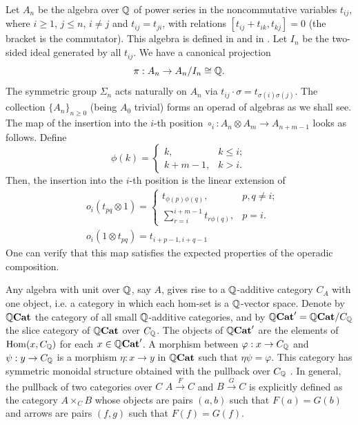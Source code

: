 \documentclass[TFM.tex]{subfiles}
\begin{document}
Let $A_n$ be the algebra over $\mathbb{Q}$ of power series in the noncommutative variables $t_{ij}$, where $i\geq 1$, $j\leq n$, $i\neq j$ and $t_{ij}=t_{ji}$, with relations $[t_{ij}+t_{ik},t_{kj}]=0$ (the bracket is the commutator). This algebra is defined in \cite{Tamarkin} and in \cite{1deTamarkin}. Let $I_n$ be the two-sided ideal generated by all $t_{ij}$. We have a canonical projection 
\begin{equation}\label{canonical}
\pi:A_n\to A_n/I_n\cong\mathbb{Q}.
\end{equation}
The symmetric group $\Sigma_n$ acts naturally on $A_n$ via  $t_{ij}\cdot\sigma=t_{\sigma(i)\sigma(j)}$. The collection $\{A_n\}_{n\geq 0}$ (being $A_0$ trivial) forms an operad of algebras as we shall see. The map of the insertion into the $i$-th position $\circ_i: A_n\otimes A_m\to A_{n+m-1}$ looks as follows. Define
\[
\phi(k)=\begin{cases}
k, & k\leq i;\\
k+m-1, & k>i.
\end{cases}
\]
Then, the insertion into the $i$-th position is the linear extension of
\begin{align*}
&o_i(t_{pq}\otimes 1)=\begin{cases}
t_{\phi(p)\phi(q)}, &p,q\neq i;\\
\sum_{r=i}^{i+m-1}t_{r\phi(q)}, & p=i.
\end{cases} \\
& o_i(1\otimes t_{pq})=t_{i+p-1,i+q-1}
\end{align*}
One can verify that this map satisfies the expected properties of the operadic composition. %

Any algebra with unit over $\mathbb{Q}$, say $A$, gives rise to a $\mathbb{Q}$-additive category $C_A$ with one object, i.e. a category in which each hom-set is a $\mathbb{Q}$-vector space. Denote by $\mathbb{Q}\mathrm{\mathbf{Cat}}$ the category of all small $\mathbb{Q}$-additive categories, and by $\mathbb{Q}\mathrm{\mathbf{Cat}}'=\mathbb{Q}\mathrm{\mathbf{Cat}}/C_{\mathbb{Q}}$ the slice category of $\mathbb{Q}\mathrm{\mathbf{Cat}}$ over $C_{\mathbb{Q}}$. The objects of $\mathbb{Q}\mathrm{\mathbf{Cat}}'$ are the elements of $\operatorname{Hom}(x, C_{\mathbb{Q}})$ for each $x\in \mathbb{Q}\mathrm{\mathbf{Cat}}'$. A morphism between $\varphi:x\to C_{\mathbb{Q}}$ and $\psi:y\to C_{\mathbb{Q}}$ is a morphism $\eta: x\to y$ in $\mathbb{Q}\mathrm{\mathbf{Cat}}$ such that $\eta\psi=\varphi$.  This category has symmetric monoidal structure obtained with the pullback over $C_{\mathbb{Q}}$ \cite[]{handbook}. In general, the pullback of two categories over $C$ $A\xrightarrow{F}C$ and $B\xrightarrow{G}C$ is explicitly defined as the category $A\times_C B$ whose objects are pairs $(a,b)$ such that $F(a)=G(b)$ and arrows are pairs $(f,g)$ such that $F(f)=G(f)$.
\end{document}
